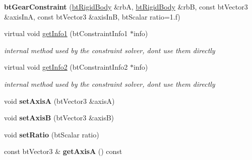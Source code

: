 \begin{DoxyCompactItemize}
\mbox{\label{classbtGearConstraint_aee33fd1dac22b6f0323757057204e891}} 
{\bfseries bt\+Gear\+Constraint} (\hyperlink{classbtRigidBody}{bt\+Rigid\+Body} \&rbA, \hyperlink{classbtRigidBody}{bt\+Rigid\+Body} \&rbB, const bt\+Vector3 \&axis\+InA, const bt\+Vector3 \&axis\+InB, bt\+Scalar ratio=1.f)
\item 
\mbox{\label{classbtGearConstraint_a0db1b260e1c4b050a0f904b75f2624c1}} 
virtual void \hyperlink{classbtGearConstraint_a0db1b260e1c4b050a0f904b75f2624c1}{get\+Info1} (bt\+Constraint\+Info1 $\ast$info)
\begin{DoxyCompactList}\small\item\em internal method used by the constraint solver, don\textquotesingle{}t use them directly \end{DoxyCompactList}\item 
\mbox{\label{classbtGearConstraint_ae872512ec9203a76fdb0496af59af9f5}} 
virtual void \hyperlink{classbtGearConstraint_ae872512ec9203a76fdb0496af59af9f5}{get\+Info2} (bt\+Constraint\+Info2 $\ast$info)
\begin{DoxyCompactList}\small\item\em internal method used by the constraint solver, don\textquotesingle{}t use them directly \end{DoxyCompactList}\item 
\mbox{\label{classbtGearConstraint_a7eb82d1854a2ab8982d65af6d2bde007}} 
void {\bfseries set\+AxisA} (bt\+Vector3 \&axisA)
\item 
\mbox{\label{classbtGearConstraint_a846bd7962b466bf4a2796811d7fee1d8}} 
void {\bfseries set\+AxisB} (bt\+Vector3 \&axisB)
\item 
\mbox{\label{classbtGearConstraint_a77e0470a164f0fb52aba7fc1fa6aae9e}} 
void {\bfseries set\+Ratio} (bt\+Scalar ratio)
\item 
\mbox{\label{classbtGearConstraint_a6b2e52133e6c014ef941ac058583a38b}} 
const bt\+Vector3 \& {\bfseries get\+AxisA} () const
\item 
\mbox{\label{classbtGearConstraint_acc8047ff8a806ed857bf8ebdeaa790a1}} 

\end{DoxyCompactItemize}
